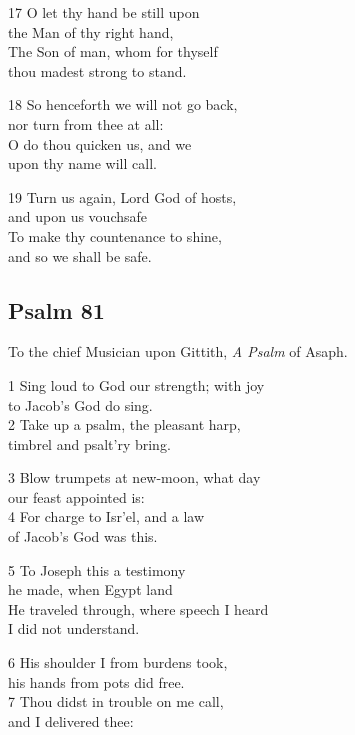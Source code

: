 17 O let thy hand be still upon\\
the Man of thy right hand,\\
The Son of man, whom for thyself\\
thou madest strong to stand.

18 So henceforth we will not go back,\\
nor turn from thee at all:\\
O do thou quicken us, and we\\
upon thy name will call.

19 Turn us again, Lord God of hosts,\\
and upon us vouchsafe\\
To make thy countenance to shine,\\
and so we shall be safe.

\begin{center}
\quad{}\quad{}
\end{center}

\subsection*{Psalm 81}

To the chief Musician upon Gittith,
\emph{A Psalm} of Asaph.

1 Sing loud to God our strength; with joy\\
to Jacob’s God do sing.\\
2 Take up a psalm, the pleasant harp,\\
timbrel and psalt’ry bring.

3 Blow trumpets at new-moon, what day\\
our feast appointed is:\\
4 For charge to Isr’el, and a law\\
of Jacob’s God was this.

5 To Joseph this a testimony\\
he made, when Egypt land\\
He traveled through, where speech I heard\\
I did not understand.

6 His shoulder I from burdens took,\\
his hands from pots did free.\\
7 Thou didst in trouble on me call,\\
and I delivered thee:


